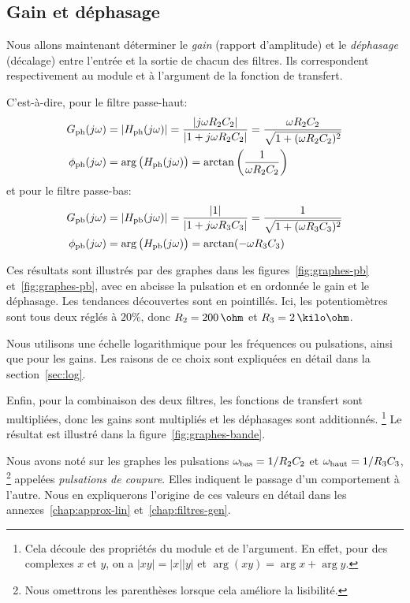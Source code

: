 \subsection{Gain et déphasage}

Nous allons maintenant déterminer
le \emph{gain} (rapport d'amplitude) et le  \emph{déphasage} (décalage)
entre l'entrée et la sortie de chacun des filtres.
Ils correspondent respectivement au module et à l'argument de la fonction de
transfert.

C'est-à-dire, pour le filtre passe-haut:
\begin{align}
    G_{\mathrm{ph}}(j\omega) &= |H_{\mathrm{ph}}(j\omega)|
    = \frac{|j\omega R_2C_2|}{|1 + j\omega R_2C_2|}
    = \frac{\omega R_2C_2}{\sqrt{1+(\omega R_2C_2)^2}}\\
    \phi_{\mathrm{ph}}(j\omega) &= \arg\big(H_{\mathrm{ph}}(j\omega)\big)
    = \arctan\left(\frac{1}{\omega R_2C_2}\right)
\end{align}
et pour le filtre passe-bas:
\begin{align}
    G_{\mathrm{pb}}(j\omega) &= |H_{\mathrm{pb}}(j\omega)|
    = \frac{|1|}{|1 + j\omega R_3C_3|}
    = \frac{1}{\sqrt{1+(\omega R_3C_3)^2}}\\
    \phi_{\mathrm{pb}}(j\omega) &= \arg\big(H_{\mathrm{pb}}(j\omega)\big)
    = \arctan(-\omega R_3C_3)
\end{align}

Ces résultats sont illustrés par des graphes dans
les figures~\ref{fig:graphes-pb} et~\ref{fig:graphes-pb},
avec en abcisse la pulsation
et en ordonnée le gain et le déphasage.
Les tendances découvertes sont en pointillés.
Ici, les potentiomètres sont tous deux réglés à $20\%$,
donc $R_2 = 200\,\ohm$ et $R_3 = 2\,\kilo\ohm$.

Nous utilisons une échelle logarithmique pour les fréquences
ou pulsations, ainsi que pour les gains.
Les raisons de ce choix sont expliquées en détail dans
la section~\ref{sec:log}.

Enfin, pour la combinaison des deux filtres,
les fonctions de transfert sont multipliées,
donc les gains sont multipliés et les déphasages sont additionnés.%
\footnote{
    Cela découle des propriétés du module et de l'argument.
    En effet, pour des complexes $x$ et $y$,
    on a $|xy| = |x||y|$ et $\arg(xy) = \arg x + \arg y$.
}
Le résultat est illustré dans la figure~\ref{fig:graphes-bande}.

Nous avons noté sur les graphes les pulsations
$\omega_{\mathrm{bas}} = 1/R_2C_2$ et $\omega_{\mathrm{haut}}=1/R_3C_3$,%
\footnote{Nous omettrons les parenthèses lorsque cela améliore la lisibilité.}
appelées \emph{pulsations de coupure}.
Elles indiquent le passage d'un comportement à l'autre.
Nous en expliquerons l'origine de ces valeurs en détail dans les
annexes~\ref{chap:approx-lin} et~\ref{chap:filtres-gen}.
